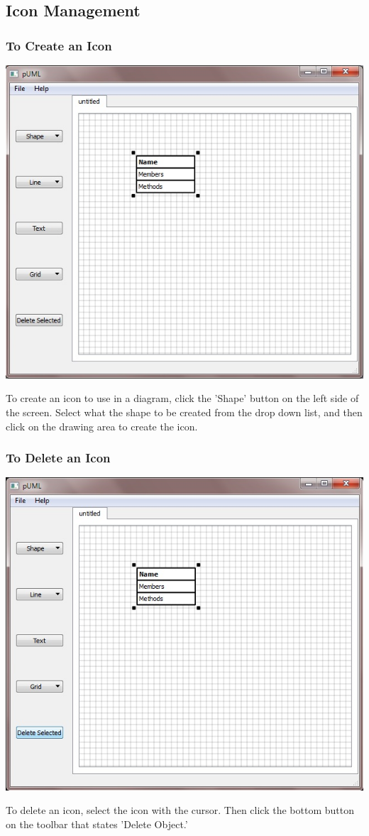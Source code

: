 \documentclass[]{article}
\begin{document}
\subsection{Icon Management}
\subsubsection{To Create an Icon}
{\color{black}
\includegraphics[scale = .50]{CreateIcon}

To create an icon to use in a diagram, click the  'Shape' button on the left side of the screen. Select what the shape to be created from the drop down list, and then click on the drawing area to create the icon. 
}
\subsubsection{To Delete an Icon}
{\color{black}
\includegraphics[scale = .50]{DeletingIcon}

To delete an icon, select the icon with the cursor. Then click the bottom button on the toolbar that states 'Delete Object.'
}
\end{document}
